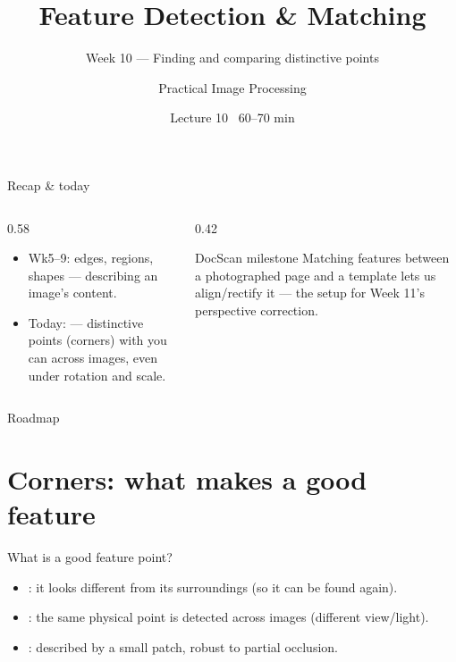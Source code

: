 \documentclass[10pt,aspectratio=169]{beamer}
\title{Feature Detection \& Matching}
\subtitle{Week 10 — Finding and comparing distinctive points}
\author{Practical Image Processing}
\date{Lecture 10 \textbullet\ 60--70 min}
\begin{document}
\maketitle

\begin{frame}{Recap \& today}
  \begin{columns}[T]
    \begin{column}{0.58\textwidth}
      \begin{itemize}
        \item Wk5--9: edges, regions, shapes — describing an image's content.
        \item \alert{Today:}  — distinctive points (corners) with 
              you can  across images, even under rotation and scale.
      \end{itemize}
    \end{column}
    \begin{column}{0.42\textwidth}
      \begin{alertblock}{DocScan milestone}
        Matching features between a photographed page and a template lets us align/rectify it —
        the setup for Week 11's perspective correction.
      \end{alertblock}
    \end{column}
  \end{columns}
\end{frame}

\begin{frame}{Roadmap}\tableofcontents\end{frame}

\section{Corners: what makes a good feature}

\begin{frame}{What is a good feature point?}
  \begin{itemize}
    \item {}: it looks different from its surroundings (so it can be found again).
    \item {}: the same physical point is detected across images (different view/light).
    \item {}: described by a small patch, robust to partial occlusion.
  \end{itemize}
\end{frame}
\end{document}

